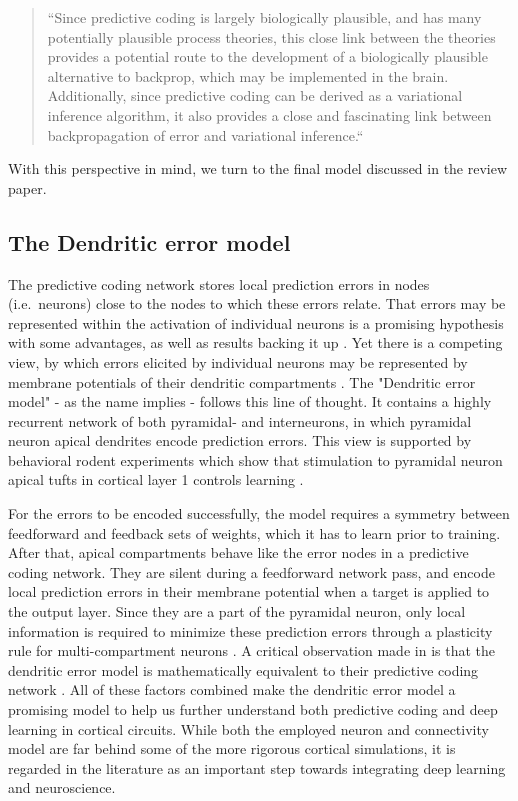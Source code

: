 \begin{quotation}
  \noindent``Since predictive coding is largely biologically plausible, and has many potentially plausible process
  theories, this close link between the theories provides a potential route to the development of a biologically
  plausible alternative to backprop, which may be implemented in the brain. Additionally, since predictive coding can be
  derived as a variational inference algorithm, it also provides a close and fascinating link between backpropagation of
  error and variational inference.`` \citep{millidge2021predictive} \end{quotation}

\noindent With this perspective in mind, we turn to the final model discussed in the review paper.

\subsection{The Dendritic error model}

The predictive coding network stores local prediction errors in nodes (i.e.\ neurons) close to the nodes to which these
errors relate. That errors may be represented within the activation of individual neurons is a promising hypothesis with
some advantages, as well as results backing it up \citep{Hertaeg2022}. Yet there is a competing view, by which errors
elicited by individual neurons may be represented by membrane potentials of their dendritic compartments
\citep{guerguiev2017towards}. The "Dendritic error model" \citep{sacramento2018dendritic} - as the name implies -
follows this line of thought. It contains a highly recurrent network of both pyramidal- and interneurons, in which
pyramidal neuron apical dendrites encode prediction errors. This view is supported by behavioral rodent experiments
which show that stimulation to pyramidal neuron apical tufts in cortical layer 1 controls learning \citep{Doron2020}.

For the errors to be encoded successfully, the model requires a symmetry between feedforward and feedback sets of
weights, which it has to learn prior to training. After that, apical compartments behave like the error nodes in a
predictive coding network. They are silent during a feedforward network pass, and encode local prediction errors in
their membrane potential when a target is applied to the output layer. Since they are a part of the pyramidal neuron,
only local information is required to minimize these prediction errors through a plasticity rule for multi-compartment
neurons \citep{urbanczik2014learning}. A critical observation made in \citep{whittington2019theories} is that the
dendritic error model is mathematically equivalent to their predictive coding network . All of these factors combined make the dendritic error model a promising model to help
us further understand both predictive coding and deep learning in cortical circuits. While both the employed neuron and
connectivity model are far behind some of the more rigorous cortical simulations, it is regarded in the literature as an
important step towards integrating deep learning and neuroscience.

